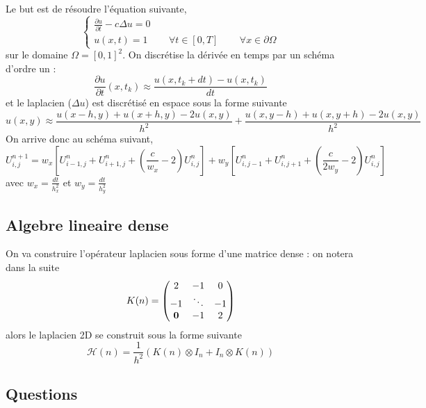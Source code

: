 \documentclass[11pt]{article}
\begin{document}
\begin{itemize}
   Le but est de résoudre l'équation suivante, 
$$
\begin{cases} 
\frac{\partial u}{\partial t} - c \Delta u = 0 \\
u(x,t) = 1 \, \qquad \forall  t \in [0,T] \qquad \,  \forall x \in \partial \Omega
\end{cases}
$$
sur le domaine $\Omega = [0,1]^2$.
On discrétise la dérivée en temps par un schéma d'ordre un :
$$
\frac{\partial u}{\partial t}(x,t_k) \approx \frac{u(x, t_k + dt) - u(x, t_k)}{dt}
$$
et le laplacien ($\Delta u$) est discrétisé en espace sous la forme suivante 
$$
u(x,y) \approx \frac{u(x-h, y) + u(x+ h, y) - 2 u(x,y)}{h^2} +  \frac{u(x, y-h) + u(x, y + h) - 2 u(x,y)}{h^2} 
$$
On arrive donc au schéma suivant, 
\begin{equation}\label{Chal}
U^{n+1}_{i,j} =  w_x \left[U^n_{i-1, j} + U^n_{i+1, j} + \left(\frac{c}{w_x}-2\right) U^n_{i,j} \right] 
             + w_y \left[U^n_{i,j-1} + U^n_{i, j+1} + \left(\frac{c}{2w_y}-2\right)U^n_{i,j} \right]
\end{equation}
avec $w_x = \frac{dt}{h_x^2}$ et $w_y = \frac{dt}{h_y^2}$

 \end{itemize}
 
   \subsection{Algebre lineaire dense}

    On va construire l'opérateur laplacien sous forme d'une matrice dense : on notera dans la suite
$$
K(n) = \begin{pmatrix}
       2       & -1      & 0 \\
       -1      &  \ddots & -1 \\
       {\bf 0} & -1      & 2 \\
       \end{pmatrix}
$$
alors le laplacien 2D se construit sous la forme suivante
$$
{\mathcal H}(n) = \frac{1}{h^2} \left( K(n) \otimes I_n + I_{n} \otimes  K(n) \right)
$$

   \subsection{Questions}
     
\end{document}

